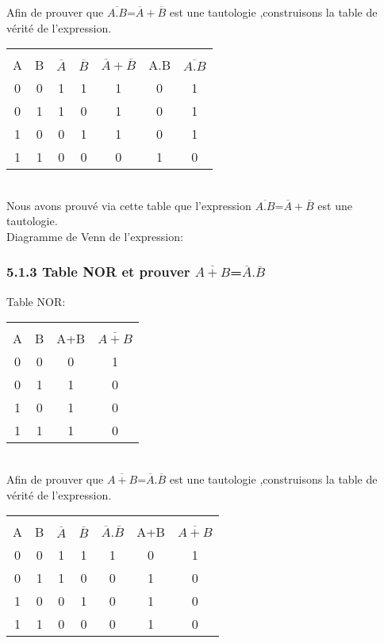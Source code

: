 \documentclass{report}
\begin{document}
\hspace*{1,5cm}Afin de prouver que $\overline{A.B}$=$\overline{A}+\overline{B}$ est une tautologie ,construisons la table de v\'erit\'e de l'expression.\\

\begin{tabular}{|c|c|c|c|c|c|c|}
\hline
 & & & & & & \\
 A & B & $\overline{A}$ & $\overline{B}$ & $\overline{A}+\overline{B}$ & A.B & $\overline{A.B}$\\
 \hline
 0&0&1&1&1&0&1\\
 0&1&1&0&1&0&1\\
 1&0&0&1&1&0&1\\
 1&1&0&0&0&1&0\\
 \hline
\end{tabular}\\
\hspace*{1,5cm} Nous avons prouv\'e via cette table que l'expression $\overline{A.B}$=$\overline{A}+\overline{B}$ est une tautologie.\\
\newpage
\hspace*{1,5cm} Diagramme de Venn de l'expression:\\
\subsubsection*{5.1.3 Table NOR et prouver $\overline{A+B}$=$\overline{A}.\overline{B}$}

\hspace{1,5cm}Table NOR: \\

\begin{tabular}{|c|c|c|c|}
\hline
 & & & \\
 A & B & A+B & $\overline{A+B}$\\
 \hline
 0 & 0 & 0 & 1\\
 0 & 1 & 1 & 0\\
 1 & 0 & 1 & 0\\
 1 & 1 & 1 & 0 \\
 \hline
\end{tabular}\\

\hspace*{1,5cm}Afin de prouver que $\overline{A+B}$=$\overline{A}.\overline{B}$ est une tautologie ,construisons la table de v\'erit\'e de l'expression.\\

\begin{tabular}{|c|c|c|c|c|c|c|}
\hline
 & & & & & & \\ 
A & B & $\overline{A}$ & $\overline{B}$ & $\overline{A}$.$\overline{B}$ & A+B & $\overline{A+B}$ \\
\hline
0&0&1&1&1&0&1\\
0&1&1&0&0&1&0\\
1&0&0&1&0&1&0\\
1&1&0&0&0&1&0\\
\hline
\end{tabular}\\
\end{document}
